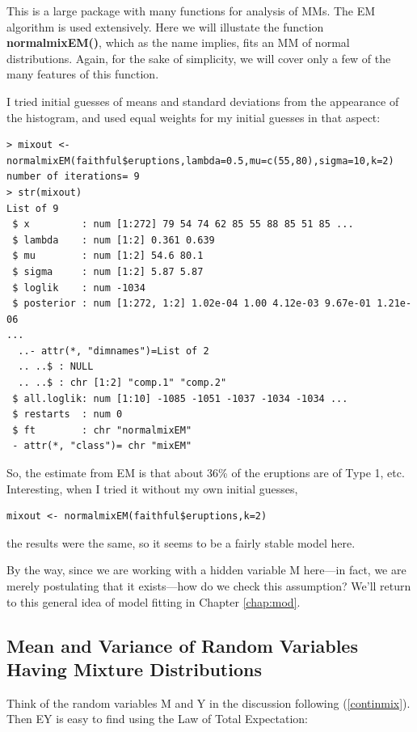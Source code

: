 \documentclass[11pt]{article}
\begin{document}
This is a large package with many functions for analysis of MMs.  The EM
algorithm is used extensively.  Here we will illustate the function
\textbf{normalmixEM()}, which as the name implies, fits an MM of normal
distributions.  Again, for the sake of simplicity, we will cover only a
few of the many features of this function.

I tried initial guesses of means and standard deviations from the
appearance of the histogram, and used equal weights for my initial
guesses in that aspect:

\begin{lstlisting}
> mixout <- normalmixEM(faithful$eruptions,lambda=0.5,mu=c(55,80),sigma=10,k=2)
number of iterations= 9 
> str(mixout)
List of 9
 $ x         : num [1:272] 79 54 74 62 85 55 88 85 51 85 ...
 $ lambda    : num [1:2] 0.361 0.639
 $ mu        : num [1:2] 54.6 80.1
 $ sigma     : num [1:2] 5.87 5.87
 $ loglik    : num -1034
 $ posterior : num [1:272, 1:2] 1.02e-04 1.00 4.12e-03 9.67e-01 1.21e-06
...
  ..- attr(*, "dimnames")=List of 2
  .. ..$ : NULL
  .. ..$ : chr [1:2] "comp.1" "comp.2"
 $ all.loglik: num [1:10] -1085 -1051 -1037 -1034 -1034 ...
 $ restarts  : num 0
 $ ft        : chr "normalmixEM"
 - attr(*, "class")= chr "mixEM"
\end{lstlisting}

So, the estimate from EM is that about 36\% of the eruptions are of Type
1, etc.  Interesting, when I tried it without my own initial guesses,

\begin{lstlisting}
mixout <- normalmixEM(faithful$eruptions,k=2)
\end{lstlisting}

the results were the same, so it seems to be a fairly stable model here.

By the way, since we are working with a hidden variable M here---in
fact, we are merely postulating that it exists---how do we check this
assumption?  We'll return to this general idea of model fitting in
Chapter \ref{chap:mod}.

\subsection{Mean and Variance of Random Variables Having Mixture
Distributions}
\label{mixmeanvar}

Think of the random variables M and Y in the discussion following
(\ref{continmix}).  Then EY is easy to find using the Law of Total
Expectation:
\end{document}
